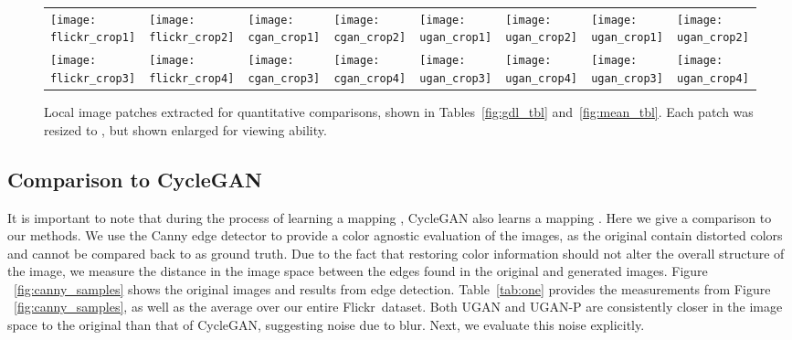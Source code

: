 \begin{figure*}[t]
\begin{tabular}{p{1.6cm} p{1.7cm} p{1.6cm} p{1.7cm} p{1.6cm} p{1.7cm} p{1.6cm} p{1.9cm} }
   
   \texttt{[image: flickr\_crop1]} &
   \texttt{[image: flickr\_crop2]} &
   \texttt{[image: cgan\_crop1]} &
   \texttt{[image: cgan\_crop2]} &
   \texttt{[image: ugan\_crop1]} &
   \texttt{[image: ugan\_crop2]} &
   \texttt{[image: ugan\_crop1]} &
   \texttt{[image: ugan\_crop2]} \\

   \texttt{[image: flickr\_crop3]} &
   \texttt{[image: flickr\_crop4]} &
   \texttt{[image: cgan\_crop3]} &
   \texttt{[image: cgan\_crop4]} &
   \texttt{[image: ugan\_crop3]} &
   \texttt{[image: ugan\_crop4]} &
   \texttt{[image: ugan\_crop3]} &
   \texttt{[image: ugan\_crop4]} \\

\end{tabular}
\caption{Local image patches extracted for quantitative comparisons, shown in Tables~\ref{fig:gdl_tbl} and~\ref{fig:mean_tbl}. 
Each patch was resized to , but shown enlarged for viewing ability.}
\label{fig:zoom}
\end{figure*}

\subsection{Comparison to CycleGAN}
It is important to note that during the process of learning a mapping , CycleGAN also learns a mapping . Here we give a comparison to our methods. We use the Canny edge detector \cite{canny1986computational} to provide 
a color agnostic evaluation of the images, as the original contain distorted colors and cannot be compared back to as ground 
truth. Due to the fact that restoring color information should not alter the overall structure of the image, we measure the 
distance in the image space between the edges found in the original and generated images. Figure ~\ref{fig:canny_samples} shows 
the original images and results from edge detection. Table~\ref{tab:one} provides the measurements from Figure 
~\ref{fig:canny_samples}, as well as the average over our entire Flickr\texttrademark\ dataset. Both UGAN and UGAN-P are 
consistently closer in the image space to the original than that of CycleGAN, suggesting noise due to blur. Next, we evaluate this 
noise explicitly.

